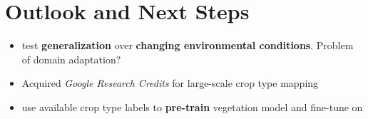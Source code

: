 \documentclass[a0]{tumposter}
\begin{document}
\begin{minipage}[t]{0.32\textwidth}


	 \section{Outlook and Next Steps}
%	 
%	 	
	 	\begin{itemize}
	 		\item test \textbf{generalization} over \textbf{changing environmental conditions}. Problem of domain adaptation?
	 		\item Acquired \textit{\color{tumblue}Google Research Credits} for large-scale crop type mapping  
	 		\item use available crop type labels to \textbf{pre-train} vegetation model and fine-tune on
	 		
	 	\end{itemize}
	 	
%	 
%	 

	\small
	
	

\end{minipage}


\end{document}
